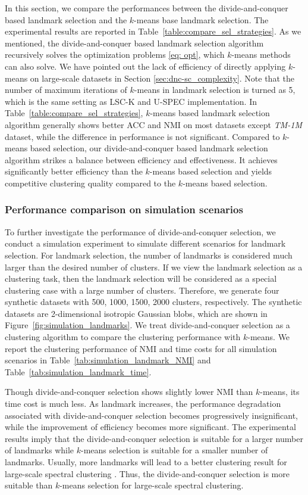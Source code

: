 In this section, we compare the performances between the divide-and-conquer based landmark selection and the $k$-means base landmark selection.
The experimental results are reported in Table~\ref{table:compare_sel_strategies}.
As we mentioned, the divide-and-conquer based landmark selection algorithm recursively solves the optimization problems \ref{eq: opt}, which $k$-means methods can also solve.
We have pointed out the lack of efficiency of directly applying $k$-means on large-scale datasets in Section \ref{sec:dnc-sc_complexity}.
Note that the number of maximum iterations of $k$-means in landmark selection is turned as 5, which is the same setting as LSC-K and U-SPEC implementation.
In Table~\ref{table:compare_sel_strategies}, $k$-means based landmark selection algorithm generally shows better ACC and NMI on most datasets except \emph{TM-1M} dataset, while the difference in performance is not significant.
Compared to $k$-means based selection, our divide-and-conquer based landmark selection algorithm strikes a balance between efficiency and effectiveness.
It achieves significantly better efficiency than the $k$-means based selection and yields competitive clustering quality compared to the $k$-means based selection.

\subsubsection{Performance comparison on simulation scenarios}
To further investigate the performance of divide-and-conquer selection, we conduct a simulation experiment to simulate different scenarios for landmark selection.
For landmark selection, the number of landmarks is considered much larger than the desired number of clusters. 
If we view the landmark selection as a clustering task, then the landmark selection will be considered as a special clustering case with a large number of clusters.
Therefore, we generate four synthetic datasets with 500, 1000, 1500, 2000 clusters, respectively. 
The synthetic datasets are 2-dimensional isotropic Gaussian blobs, which are shown in Figure~\ref{fig:simulation_landmarks}.
We treat divide-and-conquer selection as a clustering algorithm to compare the clustering performance with $k$-means.
We report the clustering performance of NMI and time costs for all simulation scenarios in Table~\ref{tab:simulation_landmark_NMI} and Table~\ref{tab:simulation_landmark_time}. 

Though divide-and-conquer selection shows slightly lower NMI than $k$-means, its time cost is much less.
As landmark increases, the performance degradation associated with divide-and-conquer selection becomes progressively insignificant, while the improvement of efficiency becomes more significant.
The experimental results imply that the divide-and-conquer selection is suitable for a larger number of landmarks while $k$-means selection is suitable for a smaller number of landmarks.
Usually, more landmarks will lead to a better clustering result for large-scale spectral clustering \cite{cai2014large,huang2019ultra}.
Thus, the divide-and-conquer selection is more suitable than $k$-means selection for large-scale spectral clustering.

